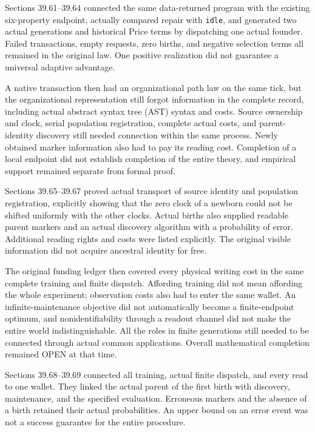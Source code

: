 \documentclass[
  english,
  11pt,
  oneside]{book}
\begin{document}
Sections 39.61--39.64 connected the same data-returned program with the existing six-property endpoint, actually compared repair with \texttt{idle}, and generated two actual generations and historical Price terms by dispatching one actual founder. Failed transactions, empty requests, zero births, and negative selection terms all remained in the original law. One positive realization did not guarantee a universal adaptive advantage.

A native transaction then had an organizational path law on the same tick, but the organizational representation still forgot information in the complete record, including actual abstract syntax tree (AST) syntax and costs. Source ownership and clock, serial population registration, complete actual costs, and parent-identity discovery still needed connection within the same process. Newly obtained marker information also had to pay its reading cost. Completion of a local endpoint did not establish completion of the entire theory, and empirical support remained separate from formal proof.

Sections 39.65--39.67 proved actual transport of source identity and population registration, explicitly showing that the zero clock of a newborn could not be shifted uniformly with the other clocks. Actual births also supplied readable parent markers and an actual discovery algorithm with a probability of error. Additional reading rights and costs were listed explicitly. The original visible information did not acquire ancestral identity for free.

The original funding ledger then covered every physical writing cost in the same complete training and finite dispatch. Affording training did not mean affording the whole experiment; observation costs also had to enter the same wallet. An infinite-maintenance objective did not automatically become a finite-endpoint optimum, and nonidentifiability through a readout channel did not make the entire world indistinguishable. All the roles in finite generations still needed to be connected through actual common applications. Overall mathematical completion remained OPEN at that time.

Sections 39.68--39.69 connected all training, actual finite dispatch, and every read to one wallet. They linked the actual parent of the first birth with discovery, maintenance, and the specified evaluation. Erroneous markers and the absence of a birth retained their actual probabilities. An upper bound on an error event was not a success guarantee for the entire procedure.
\end{document}
